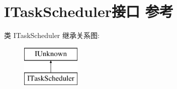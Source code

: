 \hypertarget{interface_i_task_scheduler}{}\section{I\+Task\+Scheduler接口 参考}
\label{interface_i_task_scheduler}
类 I\+Task\+Scheduler 继承关系图\+:\begin{figure}[H]
\begin{center}
\leavevmode
\includegraphics[height=2.000000cm]{interface_i_task_scheduler}
\end{center}
\end{figure}

